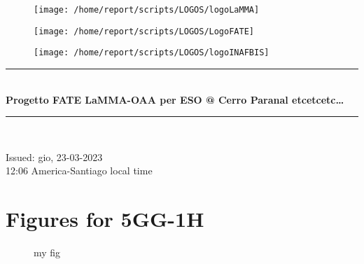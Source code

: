 \documentclass[11pt,english]{article}
\newcommand{\HRule}{\rule{\linewidth}{0.5mm}}
\begin{document}
\begin{figure}
\begin{center}
\hspace{1.5cm}
\parbox{5.5cm}{\texttt{[image: /home/report/scripts/LOGOS/logoLaMMA]}}
\hspace{.3cm}
\parbox{5.5cm}{\texttt{[image: /home/report/scripts/LOGOS/LogoFATE]}}
\hspace{.3cm}
\parbox{5.5cm}{\texttt{[image: /home/report/scripts/LOGOS/logoINAFBIS]}}
\hspace{.1cm}
\vspace{1.2cm}
\end{center}
\end{figure}

\begin{center}
\HRule \\[0.4cm]
\Huge{\textbf{Progetto FATE LaMMA-OAA per ESO @ Cerro Paranal etcetcetc\ldots}}
\HRule \\[0.4cm]
\end{center}

\begin{center}
\vspace{2cm}\Huge{Issued: gio, 23-03-2023\\ 12:06 America-Santiago local time}
\end{center}


\clearpage
\section{Figures for 5GG-1H}

\clearpage
\begin{figure}
\begin{minipage}{.5\linewidth}
\centering
{}
\end{minipage}%
\begin{minipage}{.5\linewidth}
\centering
{}
\end{minipage}\par\medskip
\centering
{}
\caption{my fig}
\label{fig:main}
\end{figure}
\end{document}
